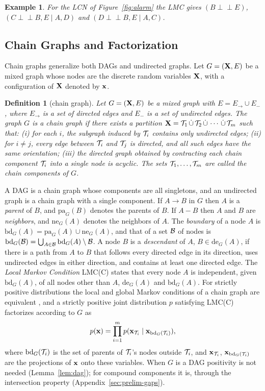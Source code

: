 \documentclass{article} %
\DeclareRobustCommand{\rev}[1]{{\color{blue}#1}}
\newtheorem{definition}{Definition}
\newtheorem{example}{Example}
\newcommand{\indep}{\perp\!\!\!\perp}
\newcommand{\pa}{\mathrm{pa}}
\begin{document}
\begin{example}
    For the LCN of Figure~\ref{fig:alarm} the LMC gives $(B\indep E)$, $(C\indep B,E\mid A,D)$ and $(D\indep B,E\mid A,C)$.
\end{example}

\subsection{Chain Graphs and Factorization}
\label{sec-cg}
Chain graphs \citep{cowell99} generalize both DAGs and undirected graphs. Let $G=(\mathbf{X},E)$ be a mixed graph whose nodes are the discrete random variables $\mathbf{X}$, with a configuration of $\mathbf{X}$ denoted by $\mathbf{x}$.

\begin{definition}[chain graph]
Let $G=(\mathbf{X},E)$ be a mixed graph with $E=E_{\to}\cup E_{-}$, where $E_{\to}$ is a set of directed edges and $E_{-}$ is a set of undirected edges. The graph $G$ is a \emph{chain graph} if there exists a partition
$\mathbf{X} = \mathcal{T}_1 \,\dot\cup\, \mathcal{T}_2 \,\dot\cup\, \cdots \,\dot\cup\, \mathcal{T}_m$ such that: (i) for each $i$, the subgraph induced by $\mathcal{T}_i$ contains only undirected edges; (ii) for $i\neq j$, every edge between $\mathcal{T}_i$ and $\mathcal{T}_j$ is directed, and all such edges have the same orientation; (iii) the directed graph obtained by contracting each chain component $\mathcal{T}_i$ into a single node is acyclic. The sets $\mathcal{T}_1,\ldots,\mathcal{T}_m$ are called the \emph{chain components} of $G$.
\end{definition}

A DAG is a chain graph whose components are all singletons, and an undirected graph is a chain graph with a single component. If $A\to B$ in $G$ then $A$ is a \emph{parent} of $B$, and $\pa_G(B)$ denotes the parents of $B$. If $A-B$ then $A$ and $B$ are \emph{neighbors}, and $\mathrm{ne}_G(A)$ denotes the neighbors of $A$. The \emph{boundary} of a node $A$ is $\mathrm{bd}_G(A)=\pa_G(A)\cup \mathrm{ne}_G(A)$, and that of a set $\mathcal{B}$ of nodes is $\mathrm{bd}_G(\mathcal{B}) = \bigcup_{A\in \mathcal{B}} \mathrm{bd}_G(A) \setminus \mathcal{B}$. A node $B$ is a \emph{descendant} of $A$, $B\in\mathrm{de}_G(A)$, if there is a path from $A$ to $B$ that follows every directed edge in its direction, uses undirected edges in either direction, and contains at least one directed edge. The \emph{Local Markov Condition} LMC(C)\label{def:lmc-cg} states that every node $A$ is independent, given $\mathrm{bd}_G(A)$, of all nodes other than $A$, $\mathrm{de}_G(A)$ and $\mathrm{bd}_G(A)$. For strictly positive distributions the local and global Markov conditions of a chain graph are equivalent \citep{cowell99}, and a strictly positive joint distribution $p$ satisfying LMC(C) factorizes according to $G$ as
\begin{equation}\label{eq:factorization}
p(\mathbf{x}) = \prod_{i=1}^m p(\mathbf{x}_{\mathcal{T}_i}\mid\mathbf{x}_{\mathrm{bd}_G(\mathcal{T}_i)}),
\end{equation}
where $\mathrm{bd}_G(\mathcal{T}_i)$ is the set of parents of $\mathcal{T}_i$'s nodes outside $\mathcal{T}_i$, and $\mathbf{x}_{\mathcal{T}_i}$, $\mathbf{x}_{\mathrm{bd}_G(\mathcal{T}_i)}$ are the projections of $\mathbf{x}$ onto these variables. \rev{When $G$ is a DAG positivity is not needed (Lemma~\ref{lem:dag}); for compound components it is, through the intersection property (Appendix~\ref{sec:prelim-gaps}).}
\end{document}
